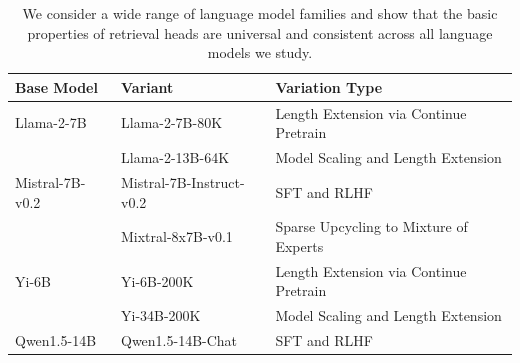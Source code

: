 \begin{table}[t!]
    \centering
    \caption{\label{tab:all_models} We consider a wide range of language model families and show that the basic properties of retrieval heads are universal and consistent across all language models we study. }
    \begin{tabular}{@{}l|l|l@{}}
    \toprule
     \bf  Base Model& \bf Variant & \bf Variation Type\\
         \midrule

     Llama-2-7B& Llama-2-7B-80K & Length Extension via Continue Pretrain\\
     &Llama-2-13B-64K & Model Scaling and Length Extension\\
          \midrule

     Mistral-7B-v0.2 & Mistral-7B-Instruct-v0.2 & SFT and RLHF\\
     & Mixtral-8x7B-v0.1 & Sparse Upcycling to Mixture of Experts\\
     \midrule
     Yi-6B      & Yi-6B-200K & Length Extension via Continue Pretrain\\
                & Yi-34B-200K & Model Scaling and Length Extension\\
     \midrule
     Qwen1.5-14B & Qwen1.5-14B-Chat& SFT and RLHF\\
     \toprule
    \end{tabular}
\end{table}
